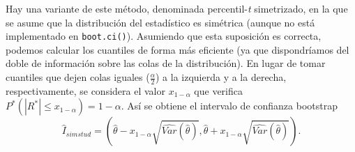 \documentclass[
  10pt,
]{book}
\theoremstyle{break}
\theoremstyle{nonumberplain}
\begin{document}
Hay una variante de este método, denominada percentil-\emph{t} simetrizado, en la que se asume que la distribución del estadístico es simétrica (aunque no está implementado en \texttt{boot.ci()}).
Asumiendo que esta suposición es correcta, podemos calcular los cuantiles de forma más eficiente (ya que dispondríamos del doble de información sobre las colas de la distribución).
En lugar de tomar cuantiles que dejen colas iguales (\(\frac{\alpha }{2}\)) a la izquierda y a la derecha, respectivamente, se considera el valor \(x_{1-\alpha }\) que verifica \(P^{\ast}\left( \left\vert R^{\ast}\right\vert \leq x_{1-\alpha } \right) =1-\alpha\).
Así se obtiene el intervalo de confianza bootstrap
\[\hat{I}_{simstud}=\left( \hat{\theta} - x_{1-\alpha}\sqrt{\widehat{Var}(\hat \theta)},\hat{\theta} + x_{1-\alpha}\sqrt{\widehat{Var}(\hat \theta)} \right).\]
\end{document}
